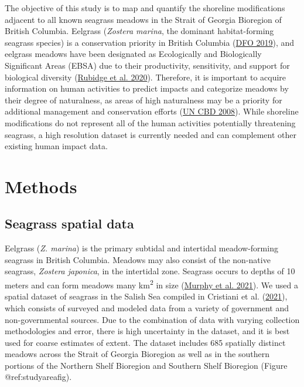 \documentclass[12pt]{article}\usepackage[]{graphicx}\usepackage[]{color}
\begin{document}
The objective of this study is to map and quantify the shoreline modifications adjacent to all known seagrass meadows in the Strait of Georgia Bioregion of British Columbia. Eelgrass (\emph{Zostera marina}, the dominant habitat-forming seagrass species) is a conservation priority in British Columbia (\protect\hyperlink{ref-DFO2019}{DFO 2019}), and eelgrass meadows have been designated as Ecologically and Biologically Significant Areas (EBSA) due to their productivity, sensitivity, and support for biological diversity (\protect\hyperlink{ref-Rubidge2020}{Rubidge et al. 2020}). Therefore, it is important to acquire information on human activities to predict impacts and categorize meadows by their degree of naturalness, as areas of high naturalness may be a priority for additional management and conservation efforts (\protect\hyperlink{ref-UNCBD2008}{UN CBD 2008}). While shoreline modifications do not represent all of the human activities potentially threatening seagrass, a high resolution dataset is currently needed and can complement other existing human impact data.

\hypertarget{methods}{%
\section{Methods}\label{methods}}

\hypertarget{seagrass-spatial-data}{%
\subsection{Seagrass spatial data}\label{seagrass-spatial-data}}

Eelgrass (\emph{Z. marina}) is the primary subtidal and intertidal meadow-forming seagrass in British Columbia. Meadows may also consist of the non-native seagrass, \emph{Zostera japonica}, in the intertidal zone. Seagrass occurs to depths of 10 meters and can form meadows many km\textsuperscript{2} in size (\protect\hyperlink{ref-Murphy2021a}{Murphy et al. 2021}). We used a spatial dataset of seagrass in the Salish Sea compiled in Cristiani et al. (\protect\hyperlink{ref-Cristiani2021}{2021}), which consists of surveyed and modeled data from a variety of government and non-governmental sources. Due to the combination of data with varying collection methodologies and error, there is high uncertainty in the dataset, and it is best used for coarse estimates of extent. The dataset includes 685 spatially distinct meadows across the Strait of Georgia Bioregion as well as in the southern portions of the Northern Shelf Bioregion and Southern Shelf Bioregion (Figure @ref:studyareafig).
\end{document}
